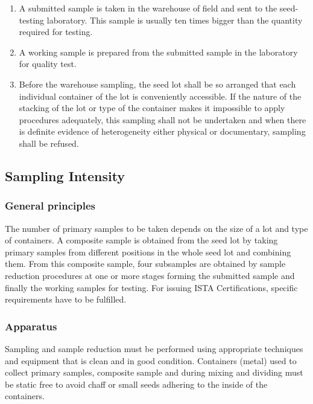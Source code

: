 \documentclass[
]{book}
\providecommand{\tightlist}{%
  \setlength{\itemsep}{0pt}\setlength{\parskip}{0pt}}
\begin{document}
\begin{enumerate}
\def\labelenumi{\arabic{enumi}.}
\tightlist
\item
  A submitted sample is taken in the warehouse of field and sent to the seed-testing laboratory. This sample is usually ten times bigger than the quantity required for testing.
\item
  A working sample is prepared from the submitted sample in the laboratory for quality test.
\item
  Before the warehouse sampling, the seed lot shall be so arranged that each individual container of the lot is conveniently accessible. If the nature of the stacking of the lot or type of the container makes it impossible to apply procedures adequately, this sampling shall not be undertaken and when there is definite evidence of heterogeneity either physical or documentary, sampling shall be refused.
\end{enumerate}

\hypertarget{sampling-intensity}{%
\subsection{Sampling Intensity}\label{sampling-intensity}}

\hypertarget{general-principles}{%
\subsubsection{General principles}\label{general-principles}}

The number of primary samples to be taken depends on the size of a lot and type of containers. A composite sample is obtained from the seed lot by taking primary samples from different positions in the whole seed lot and combining them. From this composite sample, four subsamples are obtained by sample reduction procedures at one or more stages forming the submitted sample and finally the working samples for testing. For issuing ISTA Certifications, specific requirements have to be fulfilled.

\hypertarget{apparatus}{%
\subsubsection{Apparatus}\label{apparatus}}

Sampling and sample reduction must be performed using appropriate techniques and equipment that is clean and in good condition. Containers (metal) used to collect primary samples, composite sample and during mixing and dividing must be static free to avoid chaff or small seeds adhering to the inside of the containers.
\end{document}

